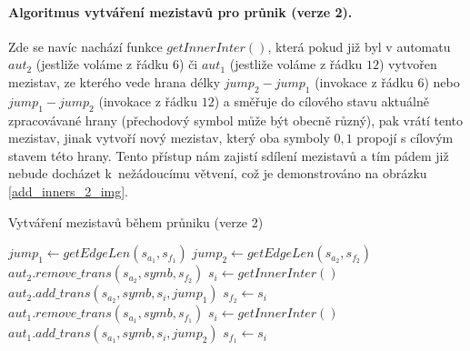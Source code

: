 \paragraph{Algoritmus vytváření mezistavů pro průnik (verze 2).} Zde se navíc nachází funkce $getInnerInter()$, která pokud již byl v automatu $aut_2$ (jestliže voláme z řádku $6$) či $aut_1$ (jestliže voláme z řádku $12$) vytvořen mezistav, ze kterého vede hrana délky $jump_2-jump_1$ (invokace z řádku $6$) nebo $jump_1-jump_2$ (invokace z řádku $12$) a směřuje do cílového stavu aktuálně zpracovávané hrany (přechodový symbol může být obecně různý), pak vrátí tento mezistav, jinak vytvoří nový mezistav, který oba symboly $0,1$ propojí s cílovým stavem této hrany. Tento přístup nám zajistí sdílení mezistavů a tím pádem již nebude docházet k~nežádoucímu větvení, což je demonstrováno na obrázku \ref{add_inners_2_img}. 


\begin{algorithm}
    \caption{Vytváření mezistavů během průniku (verze 2)}
    \label{add_inners_2}
        \begin{algorithmic}[1]
                \State $jump_1 \gets getEdgeLen(s_{a_1},s_{f_1})$
                \State $jump_2 \gets getEdgeLen(s_{a_2},s_{f_2})$
                    \State $aut_2.remove\_trans(s_{a_2}, symb, s_{f_2})$
                    \State $s_{i} \gets getInnerInter()$
                    \State $aut_2.add\_trans(s_{a_2}, symb, s_{i}, jump_1)$
                    \State $s_{f_2} \gets s_{i}$
                \EndIf
                    \State $aut_1.remove\_trans(s_{a_1}, symb, s_{f_1})$
                    \State $s_{i} \gets getInnerInter()$
                    \State $aut_1.add\_trans(s_{a_1}, symb, s_{i}, jump_2)$
                    \State $s_{f_1} \gets s_{i}$
                \EndIf
            \EndProcedure
        \end{algorithmic}
\end{algorithm} 


